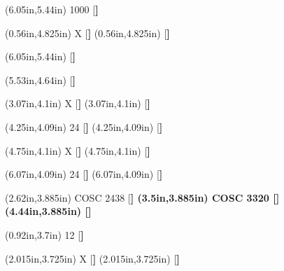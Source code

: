 \documentclass{article}
\begin{document}
    \TextAt(6.05in,5.44in) {1000}  [\footnotesize\bfseries] %

    {\TextAt(0.56in,4.825in) {X}  [\footnotesize\bfseries]} %
    {\TextAt(0.56in,4.825in) { }  [\footnotesize\bfseries]} %



    \TextAt(6.05in,5.44in) {{}}  [\footnotesize\bfseries] %

    \TextAt(5.53in,4.64in) {{}}  [\footnotesize\bfseries] %





    {\TextAt(3.07in,4.1in) {X}  [\footnotesize\bfseries]} %
    {\TextAt(3.07in,4.1in) { }  [\footnotesize\bfseries]} %

    {\TextAt(4.25in,4.09in) {{24}}  [\footnotesize\bfseries]} %
    {\TextAt(4.25in,4.09in) { }  [\footnotesize\bfseries]} %


    {\TextAt(4.75in,4.1in) {X}  [\footnotesize\bfseries]} %
    {\TextAt(4.75in,4.1in) { }  [\footnotesize\bfseries]} %

    {\TextAt(6.07in,4.09in) {{24}}   [\footnotesize\bfseries]} %
    {\TextAt(6.07in,4.09in) { }   [\footnotesize\bfseries]} %







    \TextAt(2.62in,3.885in) {{COSC 2438}}   [\footnotesize\bfseries] %
    \TextAt(3.5in,3.885in) {{COSC 3320}}   [\footnotesize\bfseries] %
    \TextAt(4.44in,3.885in) {{}}   [\footnotesize\bfseries] %

    \TextAt(0.92in,3.7in) {{12}}   [\footnotesize\bfseries]


    {\TextAt(2.015in,3.725in) {X}  [\footnotesize\bfseries]} %
    {\TextAt(2.015in,3.725in) { }  [\footnotesize\bfseries]} %
\end{document}
